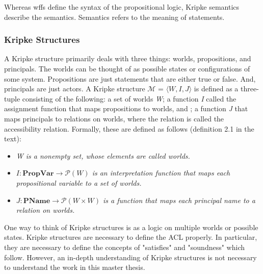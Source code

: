 \documentclass[../../main/main.tex]{subfiles}
\begin{document}
Whereas \gls{wff}s define the syntax of the propositional logic, Kripke semantics describe the semantics.  Semantics refers to the meaning of statements. 

\subsubsection{Kripke Structures}
A Kripke structure primarily deals with three things: worlds, propositions, and principals.  The worlds can be thought of as possible states or configurations of some system.  Propositions are just statements that are either true or false.  And, principals are just actors.  A Kripke structure $\mathcal{M}$ = $\langle \textit{W}, \textit{I}, \textit{J} \rangle $  is defined as a three-tuple consisting of the following: a set of worlds \textit{W}; a function \textit{I} called the assignment function that maps propositions to worlds, and ; a function \textit{J} that maps principals to relations on worlds, where the relation is called the accessibility relation.  Formally, these are defined as follows (definition 2.1 in the text): 

\begin{itemize}
\item \textit{W is a nonempty set, whose elements are called worlds.}
\item \textit{$I: \mathbf{PropVar} \rightarrow \mathcal{P}(W)$ is an interpretation function that maps each propositional variable to a set of worlds.}
\item \textit{$J: \mathbf{PName} \rightarrow \mathcal{P}(W \times W)$ is a function that maps each principal name to a relation on worlds.}
\end{itemize}

One way to think of Kripke structures is as a logic on multiple worlds or possible states.  
%
%
%
Kripke structures are necessary to define the ACL properly.  In particular, they are necessary to define the concepts of "satisfies" and "soundness" which follow.  However, an in-depth understanding of Kripke structures is not necessary to understand the work in this master thesis.  
\end{document}
